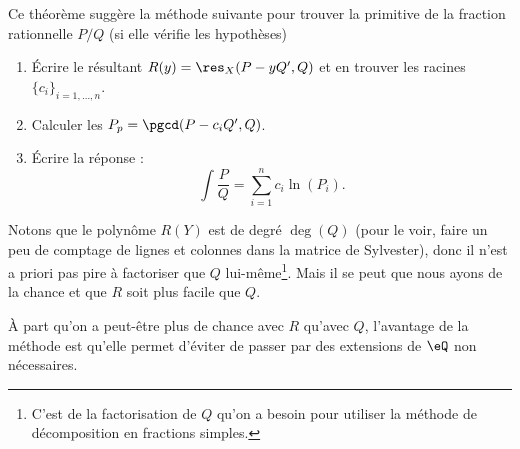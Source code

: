 Ce théorème suggère la méthode suivante pour trouver la primitive de la fraction rationnelle \( P/Q\) (si elle vérifie les hypothèses)
\begin{enumerate}
    \item
        Écrire le résultant \( R(y)=\res_X(P-yQ',Q)\) et en trouver les racines \( \{ c_i \}_{i=1,\ldots, n}\).
    \item
        Calculer les \( P_p=\pgcd(P-c_iQ',Q)\).
    \item
        Écrire la réponse :
        \begin{equation}
            \int\frac{ P }{ Q }=\sum_{i=1}^nc_i\ln(P_i).
        \end{equation}
\end{enumerate}

Notons que le polynôme \( R(Y)\) est de degré \( \deg(Q)\) (pour le voir, faire un peu de comptage de lignes et colonnes dans la matrice de Sylvester), donc il n'est a priori pas pire à factoriser que \( Q\) lui-même\footnote{C'est de la factorisation de \( Q\) qu'on a besoin pour utiliser la méthode de décomposition en fractions simples.}. Mais il se peut que nous ayons de la chance et que \( R\) soit plus facile que \( Q\).

À part qu'on a peut-être plus de chance avec \( R\) qu'avec \( Q\), l'avantage de la méthode est qu'elle permet d'éviter de passer par des extensions de \( \eQ\) non nécessaires.

